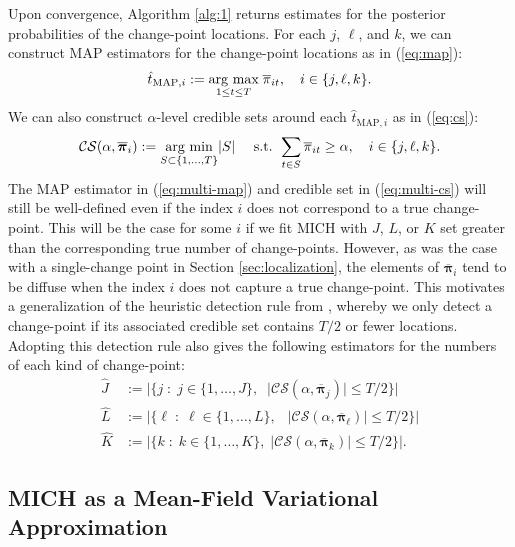 

Upon convergence, Algorithm \ref{alg:1} returns estimates for the posterior probabilities of the change-point locations. For each $j$, $\ell$, and $k$, we can construct MAP estimators for the change-point locations as in (\ref{eq:map}):
\begin{align}\label{eq:multi-map}
    \hat{t}_{\text{MAP}, i} := \underset{1 \leq t \leq T}{\text{arg max}} \; \overline{\pi}_{it}, \quad i \in \{j, \ell, k\}.
\end{align}
We can also construct $\alpha$-level credible sets around each $\hat{t}_{\text{MAP}, i}$ as in (\ref{eq:cs}):
\begin{align}\label{eq:multi-cs}
    \mathcal{CS}(\alpha, \overline{\boldsymbol{\pi}}_i) := \underset{S \subset \{1,\ldots,T\}}{\text{arg min}} |S| \quad\text{ s.t. } \sum_{t \in S} \overline{\pi}_{it} \geq \alpha, \quad i \in \{j, \ell, k\}.
\end{align}
The MAP estimator in (\ref{eq:multi-map}) and credible set in (\ref{eq:multi-cs}) will still be well-defined even if the index $i$ does not correspond to a true change-point. This will be the case for some $i$ if we fit MICH with $J$, $L$, or $K$ set greater than the corresponding true number of change-points. However, as was the case with a single-change point in Section \ref{sec:localization}, the elements of $\overline{\boldsymbol{\pi}}_i$ tend to be diffuse when the index $i$ does not capture a true change-point. This motivates a generalization  of the heuristic detection rule from \cite{Cappello22}, whereby we only detect a change-point if its associated credible set contains $T/2$ or fewer locations. Adopting this detection rule also gives the following estimators for the numbers of each kind of change-point:
\begin{align}
    \hat{J} &:= |\{j \;:\; j \in \{1,\ldots,J\}, \;\;|\mathcal{CS}(\alpha, \overline{\boldsymbol{\pi}}_j)| \leq T/2\}| \label{eq:J-estimator}\\
    \hat{L} &:= |\{\ell \;:\; \ell \in \{1,\ldots,L\},\;\;\: |\mathcal{CS}(\alpha, \overline{\boldsymbol{\pi}}_\ell)| \leq T/2\}| \label{eq:L-estimator}\\
    \hat{K} &:= |\{k \;:\; k \in \{1,\ldots,K\},\; |\mathcal{CS}(\alpha, \overline{\boldsymbol{\pi}}_k)| \leq T/2\}|. \label{eq:K-estimator}
\end{align}

\subsection{MICH as a Mean-Field Variational Approximation}
\label{sec:variational-bayes}

